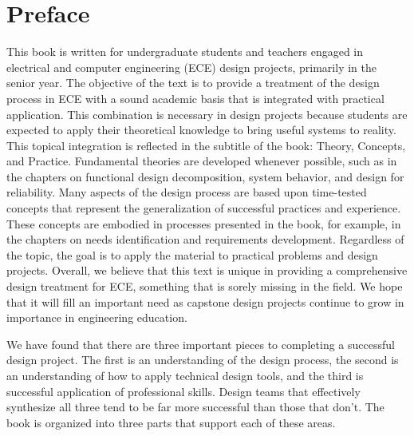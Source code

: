 \section{Preface}\label{preface}

This book is written for undergraduate students and teachers engaged in
electrical and computer engineering (ECE) design projects, primarily in
the senior year. The objective of the text is to provide a treatment of
the design process in ECE with a sound academic basis that is integrated
with practical application. This combination is necessary in design
projects because students are expected to apply their theoretical
knowledge to bring useful systems to reality. This topical integration
is reflected in the subtitle of the book: Theory, Concepts, and
Practice. Fundamental theories are developed whenever possible, such as
in the chapters on functional design decomposition, system behavior, and
design for reliability. Many aspects of the design process are based
upon time-tested concepts that represent the generalization of
successful practices and experience. These concepts are embodied in
processes presented in the book, for example, in the chapters on needs
identification and requirements development. Regardless of the topic,
the goal is to apply the material to practical problems and design
projects. Overall, we believe that this text is unique in providing a
comprehensive design treatment for ECE, something that is sorely missing
in the field. We hope that it will fill an important need as capstone
design projects continue to grow in importance in engineering education.

We have found that there are three important pieces to completing a
successful design project. The first is an understanding of the design
process, the second is an understanding of how to apply technical design
tools, and the third is successful application of professional skills.
Design teams that effectively synthesize all three tend to be far more
successful than those that don't. The book is organized into three parts
that support each of these areas.

